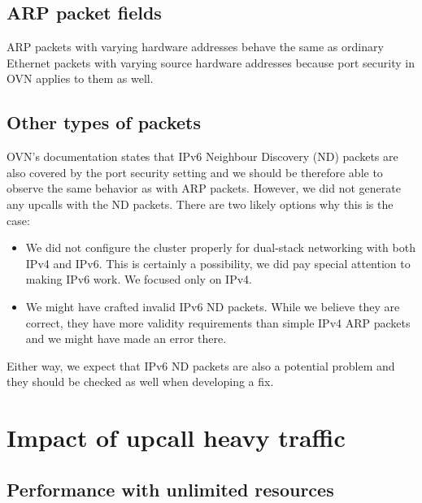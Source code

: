 \subsection{ARP packet fields}

ARP packets with varying hardware addresses behave the same as ordinary Ethernet packets with varying source hardware addresses because port security in OVN applies to them as well.

\subsection{Other types of packets}

OVN's documentation states that IPv6 Neighbour Discovery (ND) packets are also covered by the port security setting and we should be therefore able to observe the same behavior as with ARP packets. However, we did not generate any upcalls with the ND packets. There are two likely options why this is the case:

\begin{itemize}
    \item We did not configure the cluster properly for dual-stack networking with both IPv4 and IPv6. This is certainly a possibility, we did pay special attention to making IPv6 work. We focused only on IPv4.

    \item We might have crafted invalid IPv6 ND packets. While we believe they are correct, they have more validity requirements than simple IPv4 ARP packets and we might have made an error there.
\end{itemize}

Either way, we expect that IPv6 ND packets are also a potential problem and they should be checked as well when developing a fix.

\section{Impact of upcall heavy traffic}
\label{res:upcall-stress}

\subsection{Performance with unlimited resources}
\label{subsec:standard-behavior}

